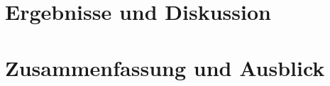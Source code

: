 \documentclass[ %
	DIV=15,
	BCOR=14mm, %
	parskip=half, %
	headsepline, %
	cleardoublepage=empty, %
	tablecaptionabove, %
	toc=bib, %
	toc=listofnumbered, %
	listof=leveldown, %
	numbers=noendperiod %
	]{scrbook}
\renewcommand\appendix{\par
	\addchap{\appendixname}
	\setcounter{section}{0}%
	\setcounter{subsection}{0}%
	\setcounter{figure}{0}%
	\renewcommand\thesection{\Alph{section}}%
	\renewcommand\thefigure{\Alph{section}.\arabic{figure}} 
	\renewcommand\thetable{\Alph{section}.\arabic{table}}}
\begin{document}

\chapter{Ergebnisse und Diskussion} %
\label{cha:ergebnisse_und_diskussion}


\chapter{Zusammenfassung und Ausblick} %
\label{cha:zusammenfassung_und_ausblick}





\appendix

\listoffigures

\listoftables
\end{document}
